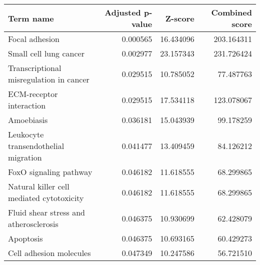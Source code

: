 \begin{tabular}{lrrr}
\toprule
                                Term name &  Adjusted p-value &   Z-score &  Combined score \\
\midrule
                           Focal adhesion &          0.000565 & 16.434096 &      203.164311 \\
                   Small cell lung cancer &          0.002977 & 23.157343 &      231.726424 \\
  Transcriptional misregulation in cancer &          0.029515 & 10.785052 &       77.487763 \\
                 ECM-receptor interaction &          0.029515 & 17.534118 &      123.078067 \\
                               Amoebiasis &          0.036181 & 15.043939 &       99.178259 \\
     Leukocyte transendothelial migration &          0.041477 & 13.409459 &       84.126212 \\
                   FoxO signaling pathway &          0.046182 & 11.618555 &       68.299865 \\
Natural killer cell mediated cytotoxicity &          0.046182 & 11.618555 &       68.299865 \\
   Fluid shear stress and atherosclerosis &          0.046375 & 10.930699 &       62.428079 \\
                                Apoptosis &          0.046375 & 10.693165 &       60.429273 \\
                  Cell adhesion molecules &          0.047349 & 10.247586 &       56.721510 \\
\bottomrule
\end{tabular}
